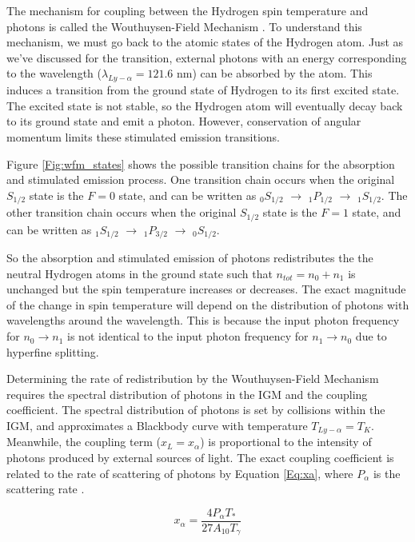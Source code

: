 The mechanism for coupling between the Hydrogen spin temperature and \lya  photons is called the Wouthuysen-Field Mechanism \cite{wouthuysen_1952}\cite{field_1958}. To understand this mechanism, we must go back to the atomic states of the Hydrogen atom. Just as we've discussed for the \cm transition, external photons with an energy corresponding to the \lya  wavelength ($\lambda_{Ly-\alpha} = 121.6$ nm) can be absorbed by the atom. This induces a transition from the ground state of Hydrogen to its first excited state. The excited state is not stable, so the Hydrogen atom will eventually decay back to its ground state and emit a photon. However, conservation of angular momentum limits these stimulated emission transitions. 

Figure \ref{Fig:wfm_states} shows the possible transition chains for the \lya absorption and stimulated emission process. One transition chain occurs when the original $S_{1/2}$ state is the $F=0$ state, and can be written as $_0S_{1/2}$ $\rightarrow$ $_1P_{1/2}$ $\rightarrow$ $_1S_{1/2}$. The other transition chain occurs when the original $S_{1/2}$ state is the $F=1$ state, and can be written as $_1S_{1/2}$ $\rightarrow$ $_1P_{3/2}$ $\rightarrow$ $_0S_{1/2}$. 

So the absorption and stimulated emission of \lya photons redistributes the the neutral Hydrogen atoms in the ground state such that $n_{tot} = n_0 + n_1$ is unchanged but the spin temperature increases or decreases. The exact magnitude of the change in spin temperature will depend on the distribution of photons with wavelengths around the \lya wavelength. This is because the input photon frequency for $n_0 \rightarrow n_1$ is not identical to the input photon frequency for $n_1 \rightarrow n_0$ due to hyperfine splitting. 

Determining the rate of redistribution by the Wouthuysen-Field Mechanism requires the spectral distribution of \lya photons in the IGM and the \lya coupling coefficient. The spectral distribution of \lya photons is set by collisions within the IGM, and approximates a Blackbody curve with temperature $T_{Ly-\alpha} = T_K$. Meanwhile, the \lya  coupling term ($x_L = x_{\alpha}$) is proportional to the intensity of \lya  photons produced by external sources of light. The exact \lya  coupling coefficient is related to the rate of scattering of \lya  photons by Equation \ref{Eq:xa}, where $P_{\alpha}$ is the scattering rate \cite{furlanetto_2006}. 

\begin{equation}\label{Eq:xa}
x_{\alpha} = \frac{4 P_{\alpha} T_*}{27 A_{10} T_{\gamma}}
\end{equation}

